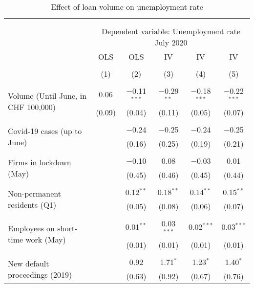 
\begin{table}[!htbp] \centering 
  \caption{Effect of loan volume on unemployment rate} 
  \label{tab:Results} 
\footnotesize 
\begin{tabular}{@{\extracolsep{5pt}}lccccc} 
\\[-1.8ex]\hline 
\hline \\[-1.8ex] 
\\[-1.8ex] & \multicolumn{5}{c}{Dependent variable: Unemployment rate July 2020} \\ 
 & OLS & OLS & IV & IV & IV \\ 
\\[-1.8ex] & (1) & (2) & (3) & (4) & (5)\\ 
\hline \\[-1.8ex] 
 \multirow{2}{4cm}{Volume (Until June, in CHF 100,000)} & 0.06 & $-$0.11$^{***}$ & $-$0.29$^{**}$ & $-$0.18$^{***}$ & $-$0.22$^{***}$ \\ 
  & (0.09) & (0.04) & (0.11) & (0.05) & (0.07) \\ 
  & & & & & \\ 
 \multirow{2}{4cm}{Covid-19 cases (up to June)} &  & $-$0.24 & $-$0.25 & $-$0.24 & $-$0.25 \\ 
  &  & (0.16) & (0.25) & (0.19) & (0.21) \\ 
  & & & & & \\ 
 \multirow{2}{4cm}{Firms in lockdown (May)} &  & $-$0.10 & 0.08 & $-$0.03 & 0.01 \\ 
  &  & (0.45) & (0.46) & (0.45) & (0.44) \\ 
  & & & & & \\ 
 \multirow{2}{4cm}{Non-permanent residents (Q1)} &  & 0.12$^{**}$ & 0.18$^{**}$ & 0.14$^{**}$ & 0.15$^{**}$ \\ 
  &  & (0.05) & (0.08) & (0.06) & (0.07) \\ 
  & & & & & \\ 
 \multirow{2}{4cm}{Employees on short-time work (May)} &  & 0.01$^{**}$ & 0.03$^{***}$ & 0.02$^{***}$ & 0.03$^{***}$ \\ 
  &  & (0.01) & (0.01) & (0.01) & (0.01) \\ 
  & & & & & \\ 
 \multirow{2}{4cm}{New default proceedings (2019)} &  & 0.92 & 1.71$^{*}$ & 1.23$^{*}$ & 1.40$^{*}$ \\ 
  &  & (0.63) & (0.92) & (0.67) & (0.76) \\ 

\end{tabular}
\end{table}
